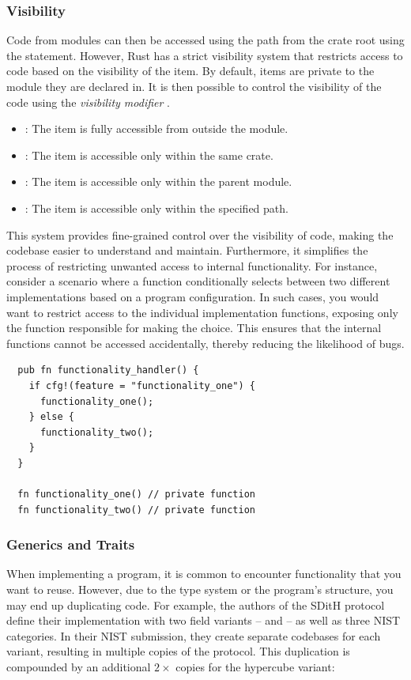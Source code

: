 \documentclass[11pt]{report}
\theoremstyle{definition}
\theoremstyle{plain}
\begin{document}
\subsubsection{Visibility} %
Code from modules can then be accessed using the path from the crate root using the  statement. However, Rust has a strict visibility system that restricts access to code based on the visibility of the item. By default, items are private to the module they are declared in. It is then possible to control the visibility of the code using the \textit{visibility modifier} .
\begin{itemize}[parsep=0pt, itemsep=0pt]
  \item {}: The item is fully accessible from outside the module.
  \item {}: The item is accessible only within the same crate.
  \item {}: The item is accessible only within the parent module.
  \item {}: The item is accessible only within the specified path.
\end{itemize}
This system provides fine-grained control over the visibility of code, making the codebase easier to understand and maintain. Furthermore, it simplifies the process of restricting unwanted access to internal functionality. For instance, consider a scenario where a function conditionally selects between two different implementations based on a program configuration. In such cases, you would want to restrict access to the individual implementation functions, exposing only the function responsible for making the choice. This ensures that the internal functions cannot be accessed accidentally, thereby reducing the likelihood of bugs.
\begin{verbatim}
  pub fn functionality_handler() {
    if cfg!(feature = "functionality_one") {
      functionality_one();
    } else {
      functionality_two();
    }
  }

  fn functionality_one() // private function
  fn functionality_two() // private function
\end{verbatim}

\subsubsection{Generics and Traits}

When implementing a program, it is common to encounter functionality that you want to reuse. However, due to the type system or the program's structure, you may end up duplicating code. For example, the authors of the SDitH protocol define their implementation with two field variants --  and  -- as well as three NIST categories. In their NIST submission, they create separate codebases for each variant, resulting in multiple copies of the protocol. This duplication is compounded by an additional $2\times$ copies for the hypercube variant:
\end{document}
